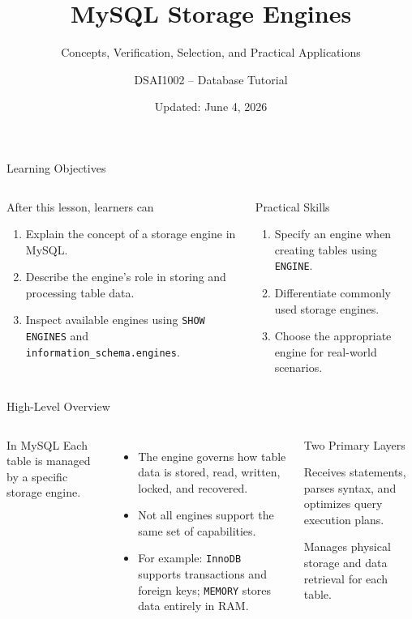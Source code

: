\documentclass[aspectratio=169,11pt]{beamer}
\title[MySQL Storage Engines]{MySQL Storage Engines}
\subtitle{Concepts, Verification, Selection, and Practical Applications}
\author{DSAI1002 -- Database Tutorial}
\date{Updated: June 4, 2026}
\newcommand{\code}[1]{\texttt{#1}}
\newcommand{\smallitem}{\setlength{\itemsep}{2pt}}
\begin{document}
\begin{frame}
  \titlepage
\end{frame}

\begin{frame}{Learning Objectives}
\begin{columns}[T,onlytextwidth]
\begin{block}{After this lesson, learners can}
\begin{enumerate}\smallitem
  \item Explain the concept of a \alert{storage engine} in MySQL.
  \item Describe the engine's role in storing and processing table data.
  \item Inspect available engines using \code{SHOW ENGINES} and \code{information\_schema.engines}.
\end{enumerate}
\end{block}
\begin{block}{Practical Skills}
\begin{enumerate}\smallitem
  \setcounter{enumi}{3}
  \item Specify an engine when creating tables using \code{ENGINE}.
  \item Differentiate commonly used storage engines.
  \item Choose the appropriate engine for real-world scenarios.
\end{enumerate}
\end{block}
\end{columns}
\end{frame}

\begin{frame}{High-Level Overview}
\begin{columns}[T,onlytextwidth]
\begin{block}{In MySQL}
Each table is managed by a specific \alert{storage engine}.
\end{block}
\begin{itemize}\smallitem
  \item The engine governs how table data is stored, read, written, locked, and recovered.
  \item Not all engines support the same set of capabilities.
  \item For example: \code{InnoDB} supports transactions and foreign keys; \code{MEMORY} stores data entirely in RAM.
\end{itemize}
\begin{block}{Two Primary Layers}
\begin{description}\smallitem
  \item[SQL Layer] Receives statements, parses syntax, and optimizes query execution plans.
  \item[Engine Layer] Manages physical storage and data retrieval for each table.
\end{description}
\end{block}
\end{columns}
\end{frame}
\end{document}
